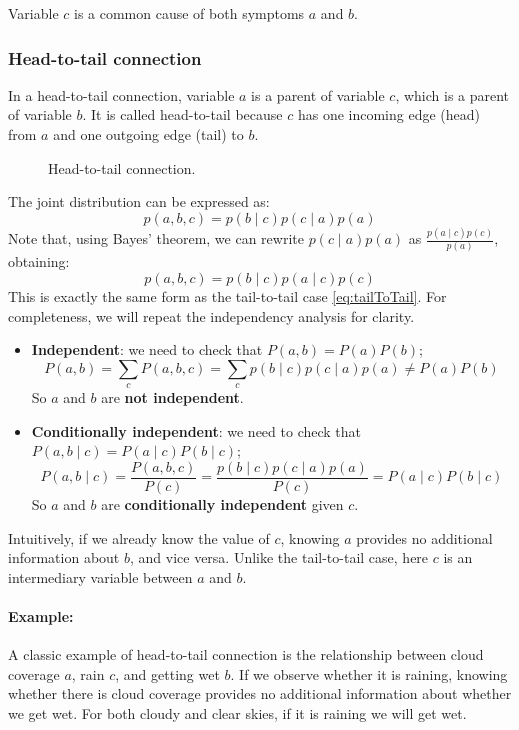 Variable $c$ is a common cause of both symptoms $a$ and $b$.

\subsubsection{Head-to-tail connection}
In a head-to-tail connection, variable $a$ is a parent of variable $c$, which is a parent of variable $b$.
It is called head-to-tail because $c$ has one incoming edge (head) from $a$ and one outgoing edge (tail) to $b$.
\begin{figure}[H]
\centering
    \caption{Head-to-tail connection.}
\end{figure}
The joint distribution can be expressed as:
\[ p(a,b,c) = p(b \mid c) p(c \mid a) p(a) \]
Note that, using Bayes' theorem, we can rewrite $p(c \mid a) p(a)$ as $\frac{p(a \mid c) p(c)}{p(a)}$, obtaining:
\[ p(a,b,c) = p(b \mid c) p(a \mid c) p(c) \]
This is exactly the same form as the tail-to-tail case \ref{eq:tailToTail}.
For completeness, we will repeat the independency analysis for clarity.
\begin{itemize}
    \item \textbf{Independent}: we need to check that $P(a, b) = P(a) P(b)$;
    \[ P(a, b) = \sum_{c} P(a, b, c) = \sum_{c} p(b \mid c) p(c \mid a) p(a) \neq P(a) P(b)\]
    So $a$ and $b$ are \textbf{not independent}.
    \item \textbf{Conditionally independent}: we need to check that $P(a, b \mid c) = P(a \mid c) P(b \mid c)$;
    \[ P(a, b \mid c) = \frac{P(a, b, c)}{P(c)} = \frac{p(b \mid c) p(c \mid a) p(a)}{P(c)} = P(a \mid c) P(b \mid c) \]
    So $a$ and $b$ are \textbf{conditionally independent} given $c$.
\end{itemize}
Intuitively, if we already know the value of $c$, knowing $a$ provides no additional information about $b$, and vice versa.
Unlike the tail-to-tail case, here $c$ is an intermediary variable between $a$ and $b$.
\paragraph{Example:}
A classic example of head-to-tail connection is the relationship between cloud coverage $a$, rain $c$, and getting wet $b$.
If we observe whether it is raining, knowing whether there is cloud coverage provides no additional 
information about whether we get wet. For both cloudy and clear skies, if it is raining we will get wet.

